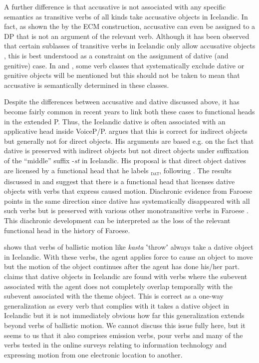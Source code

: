 \documentclass[output=paper,modfonts,nonflat,colorlinks,citecolor=brown]{langsci/langscibook}
\begin{document}
A further difference is that accusative is not associated with any specific semantics as transitive verbs of all kinds take accusative objects in Icelandic. In fact, as shown the by the ECM construction, accusative can even be assigned to a DP that is not an argument of the relevant verb. Although it has been observed that certain sublasses of transitive verbs in Icelandic only allow accusative objects \citep{Jónsson2013a}, this is best understood as a constraint on the assignment of dative (and genitive) case. In  and , some verb classes that systematically exclude dative or genitive objects will be mentioned but this should not be taken to mean that accusative is semantically determined in these classes.

Despite the differences between accusative and dative discussed above, it has become fairly common in recent years to link both these cases to functional heads in the extended {\liv}P. Thus, the Icelandic dative is often associated with an applicative head inside VoiceP/{\liv}P. \citet[128--138]{Wood2015} argues that this is correct for indirect objects but generally not for direct objects. His arguments are based e.g. on the fact that dative is preserved with indirect objects but not direct objects under suffixation of the “middle” suffix -\textit{st} in Icelandic. His proposal is that direct object datives are licensed by a functional head that he labels {\liv}\textsc{\textsubscript{dat}}, following \citet{Svenonius2006alternations}. The results discussed in  and  suggest that there is a functional head that licenses dative objects with verbs that express caused motion. Diachronic evidence from Faroese points in the same direction since dative has systematically disappeared with all such verbs but is preserved with various other monotransitive verbs in Faroese \citep{Jónsson2009}. This diachronic development can be interpreted as the loss of the relevant functional head in the history of Faroese.

\citet{Svenonius2002} shows that verbs of ballistic motion like \textit{kasta} ʽthrowʼ always take a dative object in Icelandic. With these verbs, the agent applies force to cause an object to move but the motion of the object continues after the agent has done his/her part. \citet{Svenonius2002} claims that dative objects in Icelandic are found with verbs where the subevent associated with the agent does not completely overlap temporally with the subevent associated with the theme object. This is correct as a one-way generalization as every verb that complies with it takes a dative object in Icelandic but it is not immediately obvious how far this generalization extends beyond verbs of ballistic motion. We cannot discuss this issue fully here, but it seems to us that it also comprises emission verbs, pour verbs and many of the verbs tested in the online surveys relating to information technology and expressing motion from one electronic location to another.
\end{document}

